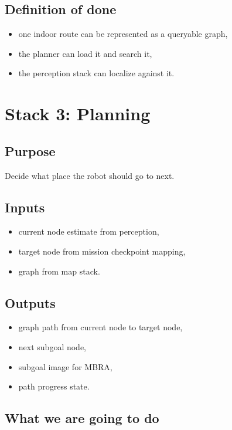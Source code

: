 \documentclass[11pt,a4paper]{article}
\begin{document}
\subsection{Definition of done}

\begin{itemize}[nosep]
  \item one indoor route can be represented as a queryable graph,
  \item the planner can load it and search it,
  \item the perception stack can localize against it.
\end{itemize}


\section{Stack 3: Planning}

\subsection{Purpose}

Decide what place the robot should go to next.

\subsection{Inputs}

\begin{itemize}[nosep]
  \item current node estimate from perception,
  \item target node from mission checkpoint mapping,
  \item graph from map stack.
\end{itemize}

\subsection{Outputs}

\begin{itemize}[nosep]
  \item graph path from current node to target node,
  \item next subgoal node,
  \item subgoal image for MBRA,
  \item path progress state.
\end{itemize}

\subsection{What we are going to do}
\end{document}
